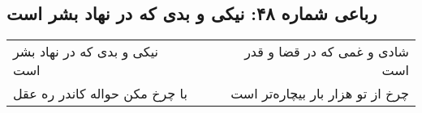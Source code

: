 \begin{center}
\section*{رباعی شماره ۴۸: نیکی و بدی که در نهاد بشر است}
\label{sec:sh048}
\begin{longtable}{l p{0.5cm} r}
نیکی و بدی که در نهاد بشر است
&&
شادی و غمی که در قضا و قدر است
\\
با چرخ مکن حواله کاندر ره عقل
&&
چرخ از تو هزار بار بیچاره‌تر است
\\
\end{longtable}
\end{center}
